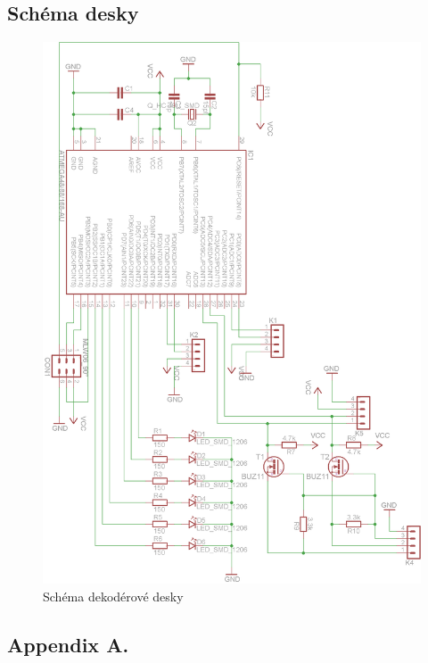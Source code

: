 \documentclass[a4paper,11pt]{article}
\begin{document}
\newpage
\subsection{Schéma desky}
\begin{figure}[h]
	\centering
		\includegraphics[scale=0.8]{dekoderySchema.png}
	\caption{Schéma dekodérové desky}
	\label{fig:dekoderySchema}
\end{figure}

\newpage
\subsection{Appendix A.}
\end{document}
